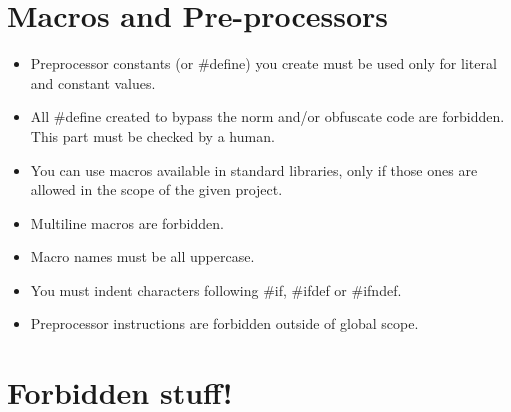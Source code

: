\documentclass{42-en}
\begin{document}
    \section{Macros and Pre-processors}

        \begin{itemize}

            \item Preprocessor constants (or \#define) you create must be used
                only for literal and constant values.
            \item All \#define created to bypass the norm and/or obfuscate
                code are forbidden. This part must be checked by a human.
            \item You can use macros available in standard libraries, only
                if those ones are allowed in the scope of the given project.
            \item Multiline macros are forbidden.
            \item Macro names must be all uppercase.
            \item You must indent characters following \#if, \#ifdef
                or \#ifndef.
            \item Preprocessor instructions are forbidden outside of global scope.

        \end{itemize}
        \newpage


    \section{Forbidden stuff!}
\end{document}
